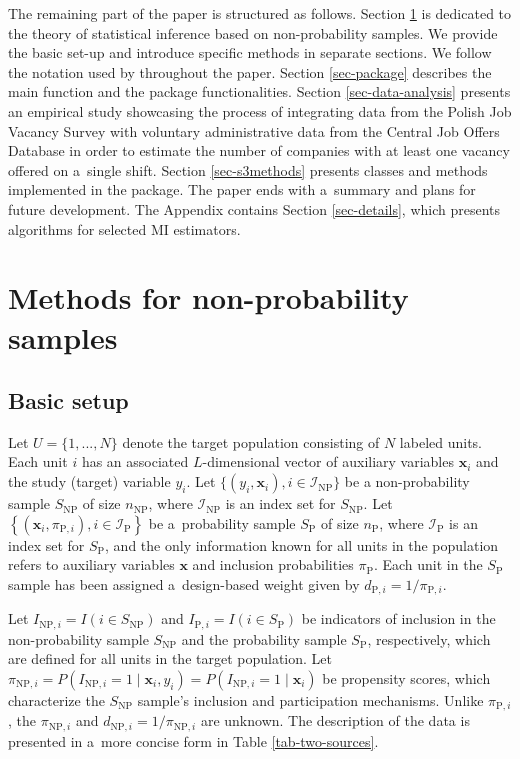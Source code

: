 \documentclass[
]{jss}
\begin{document}
The remaining part of the paper is structured as follows. Section
\ref{sec-methods} is dedicated to the theory of statistical inference
based on non-probability samples. We provide the basic set-up and
introduce specific methods in separate sections. We follow the notation
used by \citet{wu2022statistical} throughout the paper. Section
\ref{sec-package} describes the main function and the package
functionalities. Section \ref{sec-data-analysis} presents an empirical
study showcasing the process of integrating data from the Polish Job
Vacancy Survey with voluntary administrative data from the Central Job
Offers Database in order to estimate the number of companies with at
least one vacancy offered on a~single shift. Section \ref{sec-s3methods}
presents classes and  methods implemented in the package. The
paper ends with a~summary and plans for future development. The Appendix
contains Section \ref{sec-details}, which presents algorithms for
selected MI estimators.

\section{Methods for non-probability samples}\label{sec-methods}

\subsection{Basic setup}\label{basic-setup}

Let \(U=\{1,..., N\}\) denote the target population consisting of \(N\)
labeled units. Each unit \(i\) has an associated \(L\)-dimensional
vector of auxiliary variables \(\boldsymbol{x}_{i}\) and the study
(target) variable \(y_{i}\). Let
\(\{ (y_i, \boldsymbol{x}_i), i \in \mathcal{I}_{\text{NP}}\}\) be a
non-probability sample \(S_{\text{NP}}\) of size \(n_{\text{NP}}\),
where \(\mathcal{I}_{\text{NP}}\) is an index set for \(S_{\text{NP}}\).
Let
\(\left\{\left(\boldsymbol{x}_i, \pi_{\text{P},i}\right), i \in \mathcal{I}_{\text{P}}\right\}\)
be a~probability sample \(S_{\text{P}}\) of size \(n_{\text{P}}\), where
\(\mathcal{I}_{\text{P}}\) is an index set for \(S_{\text{P}}\), and the
only information known for all units in the population refers to
auxiliary variables \(\boldsymbol{x}\) and inclusion probabilities
\(\pi_{\text{P}}\). Each unit in the \(S_{\text{P}}\) sample has been
assigned a~design-based weight given by
\(d_{\text{P},i} = 1/\pi_{\text{P},i}\).

Let \(I_{\text{NP},i}=I(i \in S_{\text{NP}})\) and
\(I_{\text{P},i}=I(i \in S_{\text{P}})\) be indicators of inclusion in
the non-probability sample \(S_{\text{NP}}\) and the probability sample
\(S_{\text{P}}\), respectively, which are defined for all units in the
target population. Let
\(\pi_{\text{NP},i}=P(I_{\text{NP},i}=1 \mid \boldsymbol{x}_i, y_i)=P(I_{\text{NP},i}=1 \mid \boldsymbol{x}_i)\)
be propensity scores, which characterize the \(S_{\text{NP}}\) sample's
inclusion and participation mechanisms. Unlike \(\pi_{\text{P},i}\), the
\(\pi_{\text{NP},i}\) and \(d_{\text{NP},i}=1/\pi_{\text{NP},i}\) are
unknown. The description of the data is presented in a~more concise form
in Table \ref{tab-two-sources}.
\end{document}

